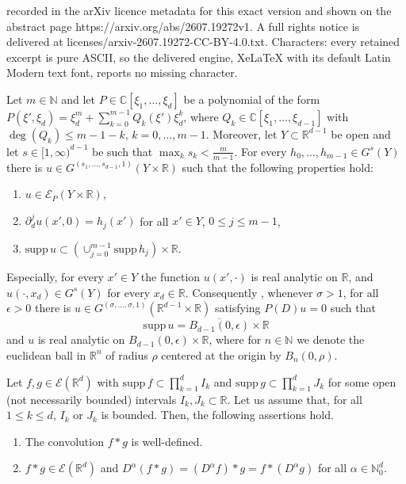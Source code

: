 \documentclass[10pt,a4paper]{amsart}
\newcommand{\C}{\mathbb{C}}
\newcommand{\N}{\mathbb{N}}
\newcommand{\R}{\mathbb{R}}
\newcommand{\supp}{\mbox{supp}\,}
\begin{document}
recorded in the arXiv licence metadata for this exact version and shown on the abstract page https://arxiv.org/abs/2607.19272v1. A full rights notice is delivered at licenses/arxiv-2607.19272-CC-BY-4.0.txt. Characters: every retained excerpt is pure ASCII, so the delivered engine, XeLaTeX with its default Latin Modern text font, reports no missing character.
\begin{theorem}\label{cohoon-solution}
	Let $m\in\N$ and let $P\in\C[\xi_1,\ldots,\xi_d]$ be a polynomial of the form $P(\xi',\xi_d)=\xi_d^m+\sum_{k=0}^{m-1}Q_k(\xi') \xi_d^k$, where $Q_k\in\C[\xi_1,\ldots,\xi_{d-1}]$ with $\operatorname{deg}(Q_k)\leq m-1-k$, $k=0,\ldots, m-1$. Moreover, let $Y\subset\R^{d-1}$ be open and let $s\in[1,\infty)^{d-1}$ be such that $\max_k s_k<\frac{m}{m-1}$. For every $h_0, \ldots, h_{m-1}\in G^s(Y)$ there is $u\in G^{(s_1,\ldots,s_{d-1},1)}(Y\times\R)$ such that the following properties hold:
	\begin{enumerate}[{\upshape(i)}]
		\item $u\in\mathscr{E}_P(Y\times\R)$, 
		\item $\partial^{j}_{d}u(x',0)=h_j(x')$ for all $x'\in Y$, $0\leq j\leq m-1$,
		\item $\supp u\subset\left(\cup_{j=0}^{m-1}\supp h_j\right)\times\R$.
	\end{enumerate}
	Especially, for every $x'\in Y$ the function $u(x',\cdot)$ is real analytic on $\R$, and $u(\cdot, x_d)\in G^s(Y)$ for every $x_d\in\R$.
	Consequently , whenever $\sigma>1$, for all $\epsilon>0$ there is $u\in G^{(\sigma,\ldots,\sigma,1)}(\R^{d-1}\times \R)$ satisfying $P(D)u=0$ such that
	\[ \supp u= \overline{B_{d-1}(0,\epsilon)}\times\R\] 
    and $u$ is real analytic on $B_{d-1}(0,\epsilon)\times\R$, where for $n\in\N$ we denote the euclidean ball in $\R^n$ of radius $\rho$ centered at the origin by $B_n(0,\rho)$.
\end{theorem}

\begin{lemma}\label{lemma:convolution f ast g}
	Let $f,g\in \mathscr{E}(\R^d)$ with $\supp f\subset\prod_{k=1}^d I_k$ and $\supp g\subset\prod_{k=1}^d J_k$ for some open (not necessarily bounded) intervals $I_k,J_k\subset\R$. Let us assume that, for all $1\leq k\leq d$, $I_k$ or $J_k$ is bounded. Then, the following assertions hold.
	\begin{enumerate}[{\upshape(i)}]
		\item The convolution $f\ast g$ is well-defined.
		\item $f\ast g\in \mathscr{E}(\R^d)$ and $D^{\alpha}(f\ast g)=(D^{\alpha}f)\ast g=f\ast (D^{\alpha}g)$ for all $\alpha\in\N_0^d$.
	\end{enumerate}
\end{lemma}
\end{document}
